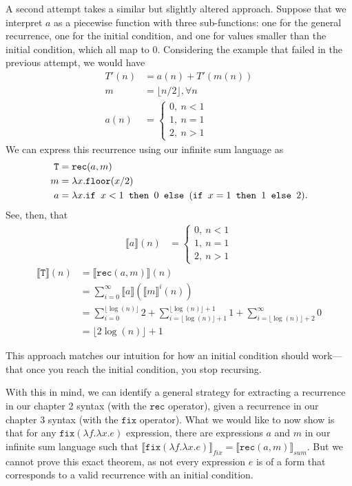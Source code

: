 A second attempt takes a similar but slightly altered approach. Suppose that we interpret $a$ as a piecewise function with three sub-functions:
one for the general recurrence, one for the initial condition, and one for values smaller than the initial condition, which all
map to $0$. Considering the example that failed in the previous attempt, we would have
\begin{align*}
T'(n) &= a(n) + T'(m(n)) \\
m &= \lfloor n/2 \rfloor, \forall n \\
a(n) &=
\begin{cases}
0, \ n < 1 \\
1, \ n = 1 \\
2, \ n > 1
\end{cases}
\end{align*}
We can express this recurrence using our infinite sum language as
\begin{align*}
\texttt{T} &= \texttt{rec}(a,m) \\
m &= \lambda x.\texttt{floor}(x/2) \\
a &= \lambda x.\texttt{if } x <1 \texttt{ then } 0 \texttt{ else } (\texttt{if } x = 1 \texttt{ then } 1 \texttt{ else } 2).
\end{align*}
See, then, that
\begin{align*}
\llbracket a \rrbracket(n) &= 
 \begin{cases}
0, \ n < 1 \\
1, \ n = 1 \\
2, \ n > 1 
\end{cases} 
\end{align*}
\begin{align*}
\llbracket \texttt{T} \rrbracket(n) &= \llbracket \texttt{rec}(a,m)\rrbracket(n) \\
&= \sum_{i=0}^{\infty}\llbracket a \rrbracket(\llbracket m\rrbracket^i(n)) \\
&= \sum_{i=0}^{\lfloor \log(n) \rfloor} 2 + \sum_{i=\lfloor \log(n) \rfloor+1 }^{\lfloor \log(n) \rfloor+1} 1 + \sum_{i =\lfloor \log(n) \rfloor + 2}^{\infty} 0 \\
&= \lfloor 2\log(n) \rfloor + 1
\end{align*}

This approach matches our intuition for how an initial condition should work---that once you reach the initial condition,
you stop recursing. 

With this in mind, we can identify a general strategy for extracting a recurrence in our chapter 2 syntax (with
the $\texttt{rec}$ operator), given a recurrence in our chapter 3 syntax (with the $\texttt{fix}$ operator). 
What we would like to now show is that for any $\texttt{fix}(\lambda f. \lambda x.e)$ expression, there are expressions $a$ and $m$
in our infinite sum language such that $\llbracket \texttt{fix}(\lambda f.\lambda x.e)\rrbracket_{fix} = 
\llbracket \texttt{rec}(a,m)\rrbracket_{sum}$. But we cannot prove this exact theorem, as not every
expression $e$ is of a form that corresponds to a valid recurrence with an initial condition.

